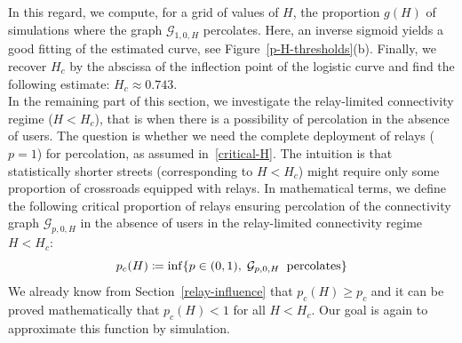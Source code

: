 \documentclass[conference]{IEEEtran}
\begin{document}
In this regard, we compute, for a grid of values of $H$, the proportion $g(H)$ of simulations where the graph $\mathcal{G}_{1,0,H}$ percolates. Here, an inverse sigmoid yields a good fitting of the estimated curve, see Figure~\ref{p-H-thresholds}(b). Finally, we recover $H_{c}$ by the abscissa of the inflection point of the logistic curve and find the following estimate: $H_c \approx 0.743$.   \\

\indent In the remaining part of this section, we investigate the relay-limited connectivity regime 
($H < H_c$), that is when there is a possibility of percolation in the absence of users. The question is whether we need the complete deployment of  
relays ($p=1$) for percolation, as assumed in~\eqref{critical-H}.
The intuition is that statistically shorter streets (corresponding to $H<H_c$) might require only some proportion of crossroads equipped with relays. In mathematical terms, we define the following critical proportion of relays ensuring percolation of the connectivity graph $\mathcal{G}_{p,0,H}$ in the absence of users in the relay-limited connectivity regime  $H<H_c$:
\begin{equation}
    \label{p_c(H)}
    p_c(H) \coloneqq \inf \lbrace p \in (0,1), \; \mathcal{G}_{p,0,H} \text{\: percolates} \rbrace
\end{equation}
We already know from Section~\ref{relay-influence} that 
$p_c(H)\ge p_c$ and it can be proved mathematically that $p_c(H)<1$ for all $H<H_c$. Our goal is again to approximate this function by simulation.
\end{document}
